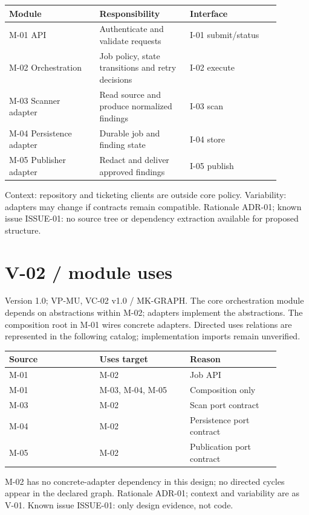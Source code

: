 \documentclass[11pt,letterpaper]{article}
\newcommand{\docsection}[1]{\Needspace{5\baselineskip}\section{#1}}
\begin{document}
\begin{longtable}{@{}>{\RaggedRight\arraybackslash}p{0.297\linewidth}>{\RaggedRight\arraybackslash}p{0.297\linewidth}>{\RaggedRight\arraybackslash}p{0.297\linewidth}@{}}
\toprule
\textbf{Module} & \textbf{Responsibility} & \textbf{Interface}\\\midrule
\endhead
M-01 API & Authenticate and validate requests & I-01 submit/status\\
M-02 Orchestration & Job policy, state transitions and retry decisions & I-02 execute\\
M-03 Scanner adapter & Read source and produce normalized findings & I-03 scan\\
M-04 Persistence adapter & Durable job and finding state & I-04 store\\
M-05 Publisher adapter & Redact and deliver approved findings & I-05 publish\\
\bottomrule
\end{longtable}
Context: repository and ticketing clients are outside core policy. Variability: adapters may change if contracts remain compatible. Rationale ADR-01; known issue ISSUE-01: no source tree or dependency extraction available for proposed structure.

\docsection{V-02 / module uses}
Version 1.0; VP-MU, VC-02 v1.0 / MK-GRAPH. The core orchestration module depends on abstractions within M-02; adapters implement the abstractions. The composition root in M-01 wires concrete adapters. Directed uses relations are represented in the following catalog; implementation imports remain unverified.

\begin{longtable}{@{}>{\RaggedRight\arraybackslash}p{0.297\linewidth}>{\RaggedRight\arraybackslash}p{0.297\linewidth}>{\RaggedRight\arraybackslash}p{0.297\linewidth}@{}}
\toprule
\textbf{Source} & \textbf{Uses target} & \textbf{Reason}\\\midrule
\endhead
M-01 & M-02 & Job API\\
M-01 & M-03, M-04, M-05 & Composition only\\
M-03 & M-02 & Scan port contract\\
M-04 & M-02 & Persistence port contract\\
M-05 & M-02 & Publication port contract\\
\bottomrule
\end{longtable}
M-02 has no concrete-adapter dependency in this design; no directed cycles appear in the declared graph. Rationale ADR-01; context and variability are as V-01. Known issue ISSUE-01: only design evidence, not code.
\end{document}
